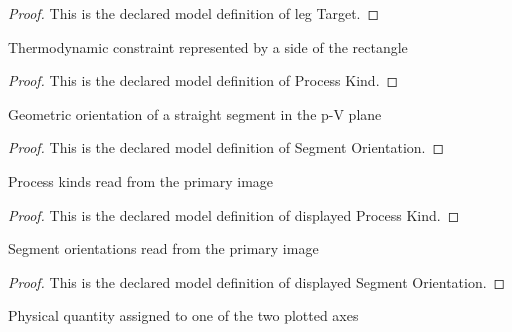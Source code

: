 \begin{proof}
  This is the declared model definition of leg Target.
\end{proof}
\begin{definition}
  \label{def:physics:phyx-mini-0425:phyxminiproblems-problemphyxmini0425-processkind}
  Thermodynamic constraint represented by a side of the rectangle
\end{definition}
\begin{proof}
  This is the declared model definition of Process Kind.
\end{proof}
\begin{definition}
  \label{def:physics:phyx-mini-0425:phyxminiproblems-problemphyxmini0425-segmentorientation}
  Geometric orientation of a straight segment in the p-V plane
\end{definition}
\begin{proof}
  This is the declared model definition of Segment Orientation.
\end{proof}
\begin{definition}
  \label{def:physics:phyx-mini-0425:phyxminiproblems-problemphyxmini0425-displayedprocesskind}
  Process kinds read from the primary image
\end{definition}
\begin{proof}
  This is the declared model definition of displayed Process Kind.
\end{proof}
\begin{definition}
  \label{def:physics:phyx-mini-0425:phyxminiproblems-problemphyxmini0425-displayedsegmentorientation}
  Segment orientations read from the primary image
\end{definition}
\begin{proof}
  This is the declared model definition of displayed Segment Orientation.
\end{proof}
\begin{definition}
  \label{def:physics:phyx-mini-0425:phyxminiproblems-problemphyxmini0425-axisquantity}
  Physical quantity assigned to one of the two plotted axes
\end{definition}
